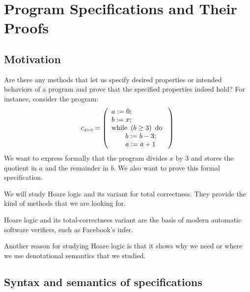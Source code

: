 \chapter{Program Specifications and Their Proofs}

\section{Motivation}

\begin{enumcirc}
	\item
	Are there any methods that let us specify desired properties or intended
	behaviors of a program and prove that the specified properties indeed hold?
	For instance, consider the program:
	\[
		c_{\textrm{\tiny div3}} =
		\left( 
			\begin{array}{l}
				a := 0;                                        \\
				b := x;                                        \\
				\textrm{while } \left( b \geq 3 \right) \textrm{ do } \\
				\qquad b := b - 3;                             \\
				\qquad a := a + 1                              \\
			\end{array}
		 \right)
	\]
	We want to express formally that the program divides $x$ by $3$ and stores the
	quotient in $a$ and the remainder in $b$.
	We also want to prove this formal specification.
	\item
	We will study Hoare logic and its variant for total correctness.
	They provide the kind of methods that we are looking for.
	\item
	Hoare logic and its total-correctness variant are the basis of modern automatic
	software verifiers, such as Facebook's infer.
	\item
	Another reason for studying Hoare logic is that it shows why we need or where
	we use denotational semantics that we studied.
\end{enumcirc}

\section{Syntax and semantics of specifications}

